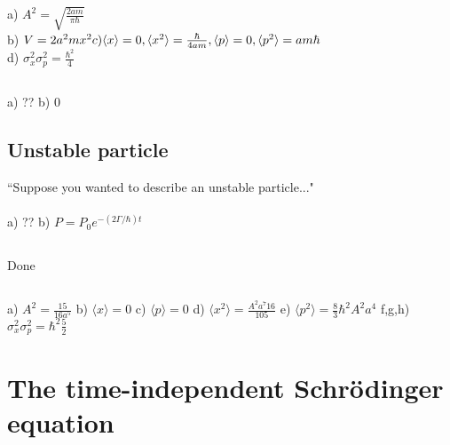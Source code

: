 \documentclass{article}
\newcommand{\<}{\langle}
\renewcommand{\>}{\rangle}
\begin{document}
\subsection{}
a) $A^2 = \sqrt{\frac{2am}{\pi \hbar}}$ \\
b) $V = 2a^2mx^2 \\
c) \<x\> = 0, \<x^2\> = \frac{\hbar}{4am}, \<p\> = 0, \<p^2\> = am\hbar$ \\
d) $\sigma_x^2 \sigma_p^2 = \frac{\hbar^2}{4}$
\subsection{}
\subsection{}
\subsection{}
\subsection{}
\subsection{}
a) ?? b) 0
\subsection{Unstable particle}
``Suppose you wanted to describe an unstable particle..."
\\ \\
a) ?? b) $P = P_0 e^{-(2\Gamma / \hbar) t}$
\subsection{}
Done
\subsection{}
a) $A^2 = \frac{15}{16 a^5}$ b) $\<x\> = 0$ c) $\<p\> = 0$ d) $\<x^2\> = \frac{A^2 a^7 16}{105}$ e) $\<p^2\> = \frac{8}{3} \hbar^2 A^2 a^4$ f,g,h) $\sigma_x^2 \sigma_p^2 = \hbar^2 \frac{5}{2}$

\section{The time-independent Schr\"odinger equation}

\subsection{}
\end{document}
